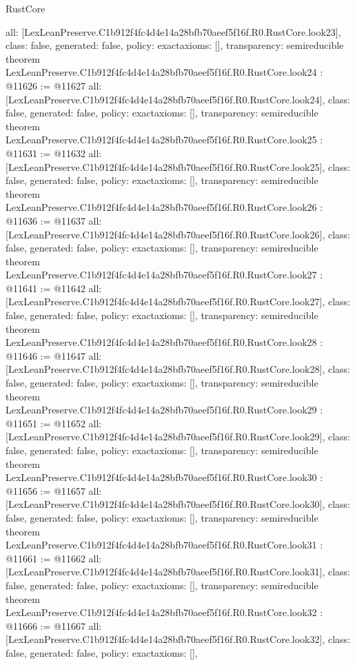 \begin{lexlean}{RustCore}
\begin{coremodule}
{  all: [LexLeanPreserve.C1b912f4fc4d4e14a28bfb70aeef5f16f.R0.RustCore.look23],
  class: false,
  generated: false,
  policy: exact{axioms: []},
  transparency: semireducible
}
theorem LexLeanPreserve.C1b912f4fc4d4e14a28bfb70aeef5f16f.R0.RustCore.look24 : @11626 := @11627 {
  all: [LexLeanPreserve.C1b912f4fc4d4e14a28bfb70aeef5f16f.R0.RustCore.look24],
  class: false,
  generated: false,
  policy: exact{axioms: []},
  transparency: semireducible
}
theorem LexLeanPreserve.C1b912f4fc4d4e14a28bfb70aeef5f16f.R0.RustCore.look25 : @11631 := @11632 {
  all: [LexLeanPreserve.C1b912f4fc4d4e14a28bfb70aeef5f16f.R0.RustCore.look25],
  class: false,
  generated: false,
  policy: exact{axioms: []},
  transparency: semireducible
}
theorem LexLeanPreserve.C1b912f4fc4d4e14a28bfb70aeef5f16f.R0.RustCore.look26 : @11636 := @11637 {
  all: [LexLeanPreserve.C1b912f4fc4d4e14a28bfb70aeef5f16f.R0.RustCore.look26],
  class: false,
  generated: false,
  policy: exact{axioms: []},
  transparency: semireducible
}
theorem LexLeanPreserve.C1b912f4fc4d4e14a28bfb70aeef5f16f.R0.RustCore.look27 : @11641 := @11642 {
  all: [LexLeanPreserve.C1b912f4fc4d4e14a28bfb70aeef5f16f.R0.RustCore.look27],
  class: false,
  generated: false,
  policy: exact{axioms: []},
  transparency: semireducible
}
theorem LexLeanPreserve.C1b912f4fc4d4e14a28bfb70aeef5f16f.R0.RustCore.look28 : @11646 := @11647 {
  all: [LexLeanPreserve.C1b912f4fc4d4e14a28bfb70aeef5f16f.R0.RustCore.look28],
  class: false,
  generated: false,
  policy: exact{axioms: []},
  transparency: semireducible
}
theorem LexLeanPreserve.C1b912f4fc4d4e14a28bfb70aeef5f16f.R0.RustCore.look29 : @11651 := @11652 {
  all: [LexLeanPreserve.C1b912f4fc4d4e14a28bfb70aeef5f16f.R0.RustCore.look29],
  class: false,
  generated: false,
  policy: exact{axioms: []},
  transparency: semireducible
}
theorem LexLeanPreserve.C1b912f4fc4d4e14a28bfb70aeef5f16f.R0.RustCore.look30 : @11656 := @11657 {
  all: [LexLeanPreserve.C1b912f4fc4d4e14a28bfb70aeef5f16f.R0.RustCore.look30],
  class: false,
  generated: false,
  policy: exact{axioms: []},
  transparency: semireducible
}
theorem LexLeanPreserve.C1b912f4fc4d4e14a28bfb70aeef5f16f.R0.RustCore.look31 : @11661 := @11662 {
  all: [LexLeanPreserve.C1b912f4fc4d4e14a28bfb70aeef5f16f.R0.RustCore.look31],
  class: false,
  generated: false,
  policy: exact{axioms: []},
  transparency: semireducible
}
theorem LexLeanPreserve.C1b912f4fc4d4e14a28bfb70aeef5f16f.R0.RustCore.look32 : @11666 := @11667 {
  all: [LexLeanPreserve.C1b912f4fc4d4e14a28bfb70aeef5f16f.R0.RustCore.look32],
  class: false,
  generated: false,
  policy: exact{axioms: []},
}
\end{coremodule}
\end{lexlean}
